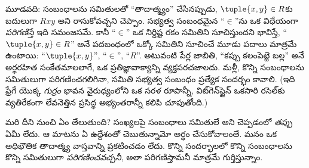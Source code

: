 \documentclass[../../../include/open-logic-section]{subfiles}
\begin{document}
మూడవది: సంబంధాలను సమితులతో ``తాదాత్మ్యం'' చేసినప్పుడు,
$\tuple{x,y} \in R$కు బదులుగా $Rxy$ అని రాసుకోవచ్చని చెప్పాం.
సభ్యత్వ సంబంధమైన ``$\in$''ను ఒక విధేయంగా \emph{పరిగణిస్తే}
ఇది సమంజసమే. కానీ ``$\in$'' ఒక నిర్దిష్ట రకం సమితిని సూచిస్తుందని
భావిస్తే, ``$\tuple{x,y} \in R$'' అనే పదబంధంలో ఒక్కో సమితిని సూచించే
మూడు పదాలు మాత్రమే ఉంటాయి: ``$\tuple{x,y}$'',
``$\in$'', ``$R$''. అటువంటి పేర్ల జాబితి, ``కప్పు కలంపెట్టె బల్ల''
అనే అర్థరహిత సంకేతమాలలాగే, ఒక ప్రతిజ్ఞావాక్యాన్ని వ్యక్తపరచజాలదు.
మళ్లీ, కొన్ని సంబంధాలను సమితులుగా పరిగణించగలిగినా, సమితి సభ్యత్వ
సంబంధం ప్రత్యేక సందర్భం కావాలి.
(ఇది ఫ్రేగే యొక్క \emph{గుర్రం} భావన వైరుధ్యంలోని ఒక సరళ రూపాన్నీ,
విట్‌గెన్‌స్టైన్ ఒకసారి రసెల్‌కు వ్యతిరేకంగా లేవనెత్తిన ప్రసిద్ధ
అభ్యంతరాన్నీ కలిపి చూపుతోంది.)

మరి దీని నుంచి ఏం తేలుతుంది? సంఖ్యలపై సంబంధాలు సమితులే అని
చెప్పడంలో \emph{తప్పు} ఏమీ లేదు. ఆ మాటను ఏ ఉద్దేశంతో చెబుతున్నామో
అర్థం చేసుకోవాలంతే. మనం ఒక అధిభౌతిక తాదాత్మ్య వాస్తవాన్ని ప్రకటించడం లేదు.
కొన్ని సందర్భాలలో కొన్ని సంబంధాలను కొన్ని సమితులుగా
\emph{పరిగణించవచ్చనీ}, అలా పరిగణిస్తామనీ మాత్రమే గుర్తిస్తున్నాం.
\end{document}
